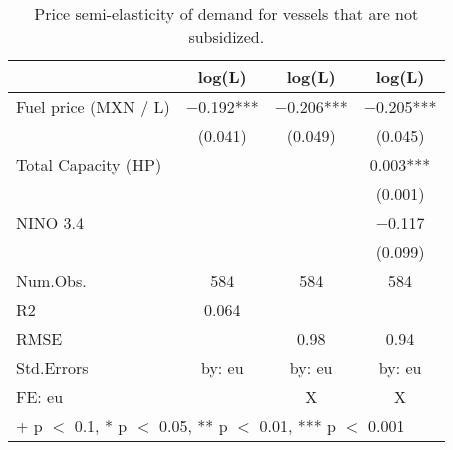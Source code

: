 \begin{table}

\caption{\label{tab:}Price semi-elasticity of demand for vessels that are not subsidized.}
\centering
\begin{tabular}[t]{lccc}
\toprule
  & log(L) & log(L)  & log(L)  \\
\midrule
Fuel price (MXN / L) & \num{-0.192}*** & \num{-0.206}*** & \num{-0.205}***\\
 & (\num{0.041}) & (\num{0.049}) & (\num{0.045})\\
Total Capacity (HP) &  &  & \num{0.003}***\\
 &  &  & (\num{0.001})\\
NINO 3.4 &  &  & \num{-0.117}\\
 &  &  & (\num{0.099})\\
\midrule
Num.Obs. & \num{584} & \num{584} & \num{584}\\
R2 & \num{0.064} &  & \\
RMSE &  & \num{0.98} & \num{0.94}\\
Std.Errors & by: eu & by: eu & by: eu\\
FE: eu &  & X & X\\
\bottomrule
\multicolumn{4}{l}{\rule{0pt}{1em}+ p $<$ 0.1, * p $<$ 0.05, ** p $<$ 0.01, *** p $<$ 0.001}\\
\end{tabular}
\end{table}
